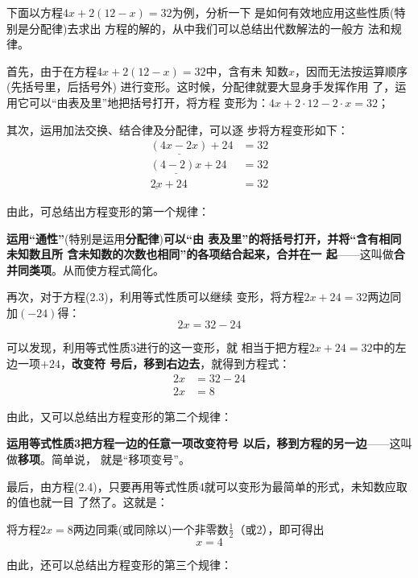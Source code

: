 下面以方程$4x+2(12-x) =32$为例，分析一下
是如何有效地应用这些性质(特别是分配律)去求出
方程的解的，从中我们可以总结出代数解法的一般方
法和规律。

首先，由于在方程$4x+2(12-x)= 32$中，含有未
知数$x$，因而无法按运算顺序(先括号里，后括号外)
进行变形。这时候，分配律就要大显身手发挥作用
了，运用它可以“由表及里”地把括号打开，将方程
变形为：$4x+2\cdot 12-2 \cdot  x = 32$；

其次，运用加法交换、结合律及分配律，可以逐
步将方程变形如下：
\begin{equation}
    \begin{split}
        \underline{(4x-2x)}+24&=32\\
        \underline{(4-2)x}+24&=32\\
        \underline{2x}+24&=32
    \end{split}
\end{equation}

由此，可总结出方程变形的第一个规律：

\textbf{运用“通性”}(特别是运用\textbf{分配律})\textbf{可以“由
表及里”的将括号打开，并将“含有相同未知数且所
含未知数的次数也相同”的各项结合起来，合并在一
起}——这叫做\textbf{合并同类项}。从而使方程式简化。

再次，对于方程(2.3)，利用等式性质可以继续
变形，将方程$2x+24 = 32$两边同加$(-24)$得：
\[2x = 32 -24\]

可以发现，利用等式性质3进行的这一变形，就
相当于把方程$2x+24 = 32$中的左边一项$+24$，\textbf{改变符
号后，移到右边去}，就得到方程式：
\begin{equation}
    \begin{split}
        2x &= 32 -24\\
        2x&=8
    \end{split}
\end{equation}

由此，又可以总结出方程变形的第二个规律：

\textbf{运用等式性质3把方程一边的任意一项改变符号
以后，移到方程的另一边}——这叫做\textbf{移项}。简单说，
就是“移项变号”。

最后，由方程(2.4)，只要再用等式性质4就可以变形为最简单的形式，未知数应取的值也就一目
了然了。这就是：

将方程$2x = 8$两边同乘(或同除以)一个非零数$\frac{1}{2}$（或2），即可得出
\begin{equation}
    x=4
\end{equation}

由此，还可以总结出方程变形的第三个规律：

